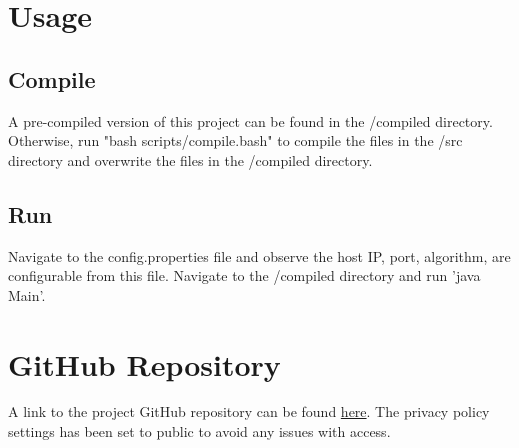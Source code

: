 \documentclass[a4paper]{article}
\begin{document}
\section{Usage}
\label{sec:section5}
\subsection{Compile}
A pre-compiled version of this project can be found in the /compiled directory. Otherwise, run "bash scripts/compile.bash" to compile the files in the /src directory and overwrite the files in the /compiled directory.

\subsection{Run}
Navigate to the config.properties file and observe the host IP, port, algorithm, are configurable from this file.
Navigate to the /compiled directory and run 'java Main'.

\section{GitHub Repository}
A link to the project GitHub repository can be found \href{https://github.com/shakeel-mohammed/client-server}{here}.
The privacy policy settings has been set to public to avoid any issues with access.



\end{document}
